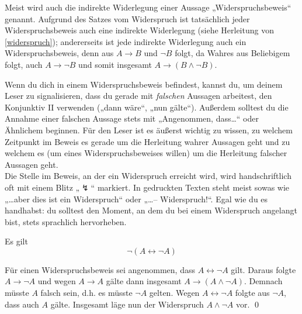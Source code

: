  
  
  \begin{bem}
Meist wird auch die indirekte Widerlegung einer Aussage „Widerspruchsbeweis“ genannt. Aufgrund des Satzes vom Widerspruch ist tatsächlich jeder Widerspruchsbeweis auch eine indirekte Widerlegung (siehe Herleitung von \cref{widerspruch}); andererseits ist jede indirekte Widerlegung auch ein Widerspruchsbeweis, denn aus $A\to B$ und $\neg B$ folgt, da Wahres aus Beliebigem folgt, auch $A\to \neg B$ und somit insgesamt $A\to (B\land \neg B)$.
\end{bem}

  
  
  \begin{bem}[Signalwörter]
 Wenn du dich in einem Widerspruchsbeweis befindest, kannst du, um deinem Leser zu signalisieren, dass du gerade mit \emph{falschen} Aussagen arbeitest, den Konjunktiv II verwenden („dann wäre“, „nun gälte“). Außerdem solltest du die Annahme einer falschen Aussage stets mit „Angenommen, dass\dots“ oder Ähnlichem beginnen. Für den Leser ist es äußerst wichtig zu wissen, zu welchem Zeitpunkt im Beweis es gerade um die Herleitung wahrer Aussagen geht und zu welchem es (um eines Widerspruchsbeweises willen) um die Herleitung falscher Aussagen geht. \\
 Die Stelle im Beweis, an der ein Widerspruch erreicht wird, wird handschriftlich oft mit einem Blitz „$\lightning$“ markiert. In gedruckten Texten steht meist sowas wie „\dots aber dies ist ein Widerspruch“ oder „\dots -- Widerspruch!“. Egal wie du es handhabst: du solltest den Moment, an dem du bei einem Widerspruch angelangt bist, stets sprachlich hervorheben.
\end{bem}







\begin{sat}[*]
 Es gilt
 \[ \neg (A\leftrightarrow \neg A) \]
\end{sat}
\begin{bew}
 Für einen Widerspruchsbeweis sei angenommen, dass $A\leftrightarrow \neg A$ gilt. Daraus folgte $A\to \neg A$ und wegen $A\to A$ gälte dann insgesamt $A\to (A\land \neg A)$. Demnach müsste $A$ falsch sein, d.h. es müsste $\neg A$ gelten. Wegen $A\leftrightarrow \neg A$ folgte aus $\neg A$, dass auch $A$ gälte. Insgesamt läge nun der Widerspruch $A\land \neg A$ vor. \qed
\end{bew}



